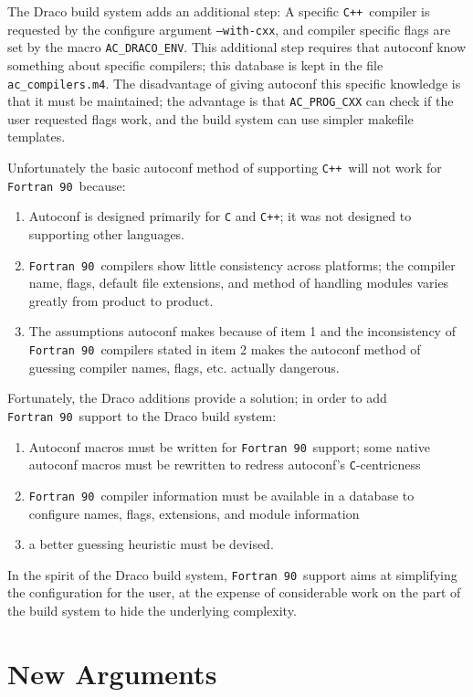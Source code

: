 \documentclass[11pt]{nmemo}
\newcommand{\fninety}{\texttt{Fortran~90}}
\newcommand{\cpp}{\texttt{C++}}
\begin{document}
The Draco build system adds an additional step: A specific \cpp\
compiler is requested by the configure argument \texttt{--with-cxx},
and compiler specific flags are set by the macro
\texttt{AC\_DRACO\_ENV}.  This additional step requires that autoconf
know something about specific compilers; this database is kept in the
file \texttt{ac\_compilers.m4}.  The disadvantage of giving autoconf
this specific knowledge is that it must be maintained; the advantage
is that \texttt{AC\_PROG\_CXX} can check if the user requested flags
work, and the build system can use simpler makefile templates.

Unfortunately the basic autoconf method of supporting \cpp\ will not
work for \fninety\ because:
\begin{enumerate}
\item Autoconf is designed primarily for \texttt{C} and \cpp; it was
not designed to supporting other languages.
\item \fninety\ compilers show little consistency across platforms;
the compiler name, flags, default file extensions, and method of
handling modules varies greatly from product to product.
\item The assumptions autoconf makes because of item 1 and the
inconsistency of \fninety\ compilers stated in item 2 makes the
autoconf method of guessing compiler names, flags, etc. actually
dangerous.
\end{enumerate}

Fortunately, the Draco additions provide a solution; in order to add
\fninety\ support to the Draco build system: 
\begin{enumerate}
\item Autoconf macros must be written for \fninety\ support; some
native autoconf macros must be rewritten to redress autoconf's
\texttt{C}-centricness  
\item \fninety\ compiler information must be available in a database
to configure names, flags, extensions, and module information
\item a better guessing heuristic must be devised.
\end{enumerate}

In the spirit of the Draco build system, \fninety\ support aims at
simplifying the configuration for the user, at the expense of
considerable work on the part of the build system to hide the
underlying complexity.

\section{New Arguments}
\end{document}
